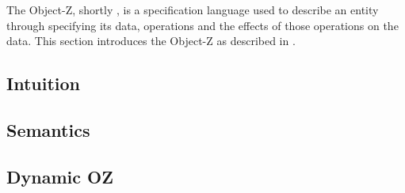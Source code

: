 The Object-Z, shortly \oz{}, is a specification language used to describe an entity through specifying its data, operations and the effects of those operations on the data. This section introduces the Object-Z as described in \cite{olderog}.
\subsection{Intuition}
\label{sec_oz_intuition}


\subsection{Semantics}
\label{sec_oz_sem}


\subsection{Dynamic OZ}
\label{sec_oz_dynamic_oz}

